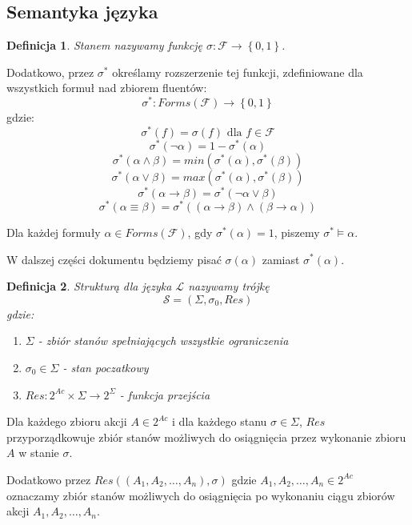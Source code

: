 \documentclass[11pt,a4paper]{article}
\newtheorem{defn}{Definicja}
\begin{document}
\subsection{Semantyka języka}

\begin{defn}
Stanem nazywamy funkcję $\sigma : \mathcal{F} \rightarrow \left\{0,1\right\}$.
\end{defn}
Dodatkowo, przez $\sigma^{*}$ określamy rozszerzenie tej funkcji, zdefiniowane dla wszystkich formuł nad zbiorem fluentów:
$$\sigma^{*} : Forms(\mathcal{F}) \rightarrow \left\{0,1\right\}$$
gdzie:
$$\sigma^{*}\left(f\right) = \sigma\left(f\right) \text{ dla } f \in \mathcal{F}$$
$$\sigma^{*}\left(\neg \alpha\right) = 1 - \sigma^{*}\left(\alpha\right)$$
$$\sigma^{*}\left(\alpha \land \beta\right) = min\left(\sigma^{*}\left(\alpha\right),\sigma^{*}\left(\beta\right)\right)$$
$$\sigma^{*}\left(\alpha \lor \beta\right) = max\left(\sigma^{*}\left(\alpha\right),\sigma^{*}\left(\beta\right)\right)$$
$$\sigma^{*}\left(\alpha \rightarrow \beta\right) = \sigma^{*}\left(\neg \alpha \lor \beta\right)$$
$$\sigma^{*}\left(\alpha \equiv \beta\right) = \sigma^{*}\left(\left(\alpha \rightarrow \beta\right)\land\left(\beta \rightarrow \alpha\right)\right)$$

Dla każdej formuły $\alpha \in Forms\left(\mathcal{F}\right)$, gdy $\sigma^*\left(\alpha\right) = 1$, piszemy $\sigma^{*} \models \alpha$. 

W dalszej części dokumentu będziemy pisać $\sigma\left(\alpha\right)$ zamiast $\sigma^*\left(\alpha\right)$.

\begin{defn}
Strukturą dla języka $\mathcal{L}$ nazywamy trójkę
$$\mathcal{S} = \left(\Sigma, \sigma_0, Res\right)$$
gdzie:
\begin{enumerate}
    \item $\Sigma$ - zbiór stanów spełniających wszystkie ograniczenia
    \item $\sigma_0 \in \Sigma$ - stan poczatkowy
    \item $Res : 2^{Ac} \times \Sigma \rightarrow 2^\Sigma$ - funkcja przejścia
\end{enumerate}
\end{defn}

Dla każdego zbioru akcji $A \in 2^{Ac}$ i dla każdego stanu $\sigma \in \Sigma$, $Res$ przyporządkowuje zbiór stanów możliwych do osiągnięcia przez wykonanie zbioru $A$ w stanie $\sigma$.

Dodatkowo przez $Res\left(\left(A_1,A_2,\dots,A_n\right),\sigma\right)$ gdzie $A_1,A_2,\dots,A_n \in 2^{Ac}$ oznaczamy zbiór stanów możliwych do osiągnięcia po wykonaniu ciągu zbiorów akcji $A_1,A_2,\dots,A_n$.
\end{document}
